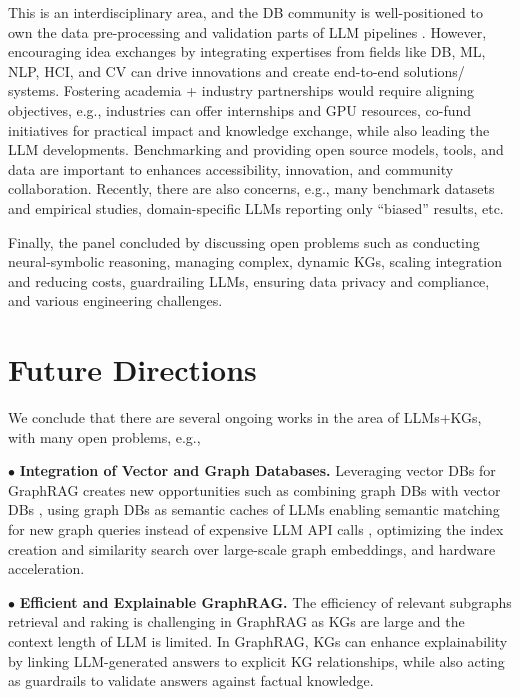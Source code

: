 \documentclass{sig-alternate-10pt}
\begin{document}
This is an interdisciplinary area, and the DB community is well-positioned to own the data pre-processing and validation parts of LLM pipelines \cite{DEEM}. However, encouraging idea exchanges by integrating expertises from fields like DB, ML, NLP, HCI, and CV can drive innovations and create end-to-end solutions/ systems. Fostering academia + industry partnerships would require aligning objectives, e.g., industries can 
offer internships and GPU resources, co-fund initiatives for practical impact and knowledge exchange, while also leading the LLM developments. Benchmarking and providing open source models, tools, and data are important to enhances accessibility, innovation, and community collaboration. Recently, there are also concerns, e.g., many benchmark datasets and empirical studies, 
domain-specific LLMs reporting only “biased” results, etc.

Finally, the panel concluded by discussing open problems such as conducting neural-symbolic reasoning, managing complex, dynamic KGs,
scaling integration and reducing costs,
guardrailing LLMs, ensuring data privacy and compliance, and various engineering challenges.

\section{Future Directions}
\label{sec:conclusion}

\medskip
\medskip

We conclude that there are several
ongoing works in the area of LLMs+KGs, with many open problems, e.g., 

\noindent $\bullet$ \textbf{Integration of Vector and Graph Databases.} Leveraging vector DBs for GraphRAG creates new opportunities such as 
combining graph DBs with vector DBs \cite{liu2025tigervectorsupportingvectorsearch}, using graph DBs as semantic caches of LLMs enabling semantic matching for new graph queries instead of expensive LLM API calls \cite{KhandelwalLJZL20}, optimizing the index creation and similarity search over large-scale graph embeddings, and hardware acceleration.


\noindent $\bullet$ \textbf{Efficient and Explainable GraphRAG.} The efficiency of relevant subgraphs retrieval and raking is challenging in GraphRAG as KGs are large and the context length of LLM is limited. In GraphRAG, KGs can enhance explainability by linking LLM-generated answers to explicit KG relationships, while also acting as guardrails to validate answers against factual knowledge. 
\end{document}
